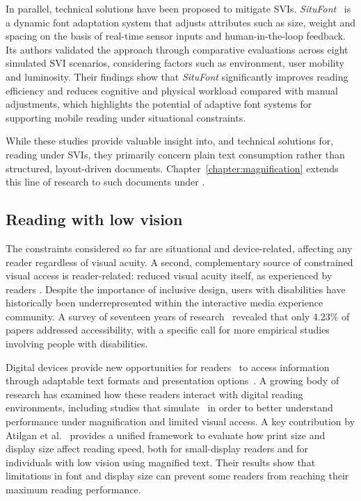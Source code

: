 In parallel, technical solutions have been proposed to mitigate SVIs. \emph{SituFont}~\cite{yue2024situfont} is a dynamic font adaptation system that adjusts attributes such as size, weight and spacing on the basis of real-time sensor inputs and human-in-the-loop feedback. Its authors validated the approach through comparative evaluations across eight simulated SVI scenarios, considering factors such as environment, user mobility and luminosity. Their findings show that \emph{SituFont} significantly improves reading efficiency and reduces cognitive and physical workload compared with manual adjustments, which highlights the potential of adaptive font systems for supporting mobile reading under situational constraints.

While these studies provide valuable insight into, and technical solutions for, reading under SVIs, they primarily concern plain text consumption rather than structured, layout-driven documents. Chapter~\ref{chapter:magnification} extends this line of research to such documents under \CVAS.

\subsection{Reading with low vision}
\label{sec:sota-low-vision}

The constraints considered so far are situational and device-related, affecting any reader regardless of visual acuity. A second, complementary source of constrained visual access is reader-related: reduced visual acuity itself, as experienced by readers \LV. Despite the importance of inclusive design, users with disabilities have historically been underrepresented within the interactive media experience community. A survey of seventeen years of research~\cite{vatavu-imx2021} revealed that only 4.23\% of papers addressed accessibility, with a specific call for more empirical studies involving people with disabilities.

Digital devices provide new opportunities for readers \LV\ to access information through adaptable text formats and presentation options~\cite{reading-digital-legge}. A growing body of research has examined how these readers interact with digital reading environments, including studies that simulate \CVAS\ in order to better understand performance under magnification and limited visual access. A key contribution by Atilgan et al.~\cite{atilgan2020} provides a unified framework to evaluate how print size and display size affect reading speed, both for small-display readers and for individuals with low vision using magnified text. Their results show that limitations in font and display size can prevent some readers from reaching their maximum reading performance.

